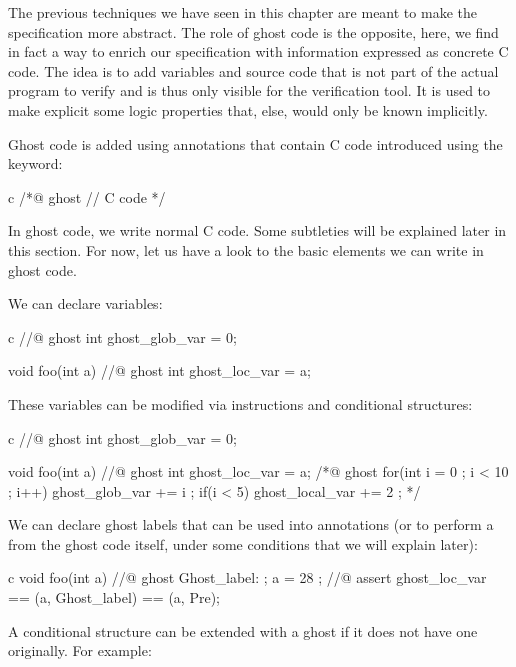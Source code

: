 
The previous techniques we have seen in this chapter are meant to make the
specification more abstract. The role of ghost code is the opposite, here, we
find in fact a way to enrich our specification with information expressed as
concrete C code. The idea is to add variables and source code that is not part
of the actual program to verify and is thus only visible for the verification
tool. It is used to make explicit some logic properties that, else, would only
be known implicitly.




Ghost code is added using annotations that contain C code
introduced using the  keyword:


\begin{CodeBlock}{c}
/*@
  ghost
  // C code
*/
\end{CodeBlock}


In ghost code, we write normal C code. Some subtleties will be explained
later in this section. For now, let us have a look to the basic elements
we can write in ghost code.


We can declare variables:


\begin{CodeBlock}{c}
//@ ghost int ghost_glob_var = 0;

void foo(int a){
  //@ ghost int ghost_loc_var = a;
}
\end{CodeBlock}


These variables can be modified via instructions and conditional structures:


\begin{CodeBlock}{c}
//@ ghost int ghost_glob_var = 0;

void foo(int a){
  //@ ghost int ghost_loc_var = a;
  /*@ ghost
    for(int i = 0 ; i < 10 ; i++){
      ghost_glob_var += i ;
      if(i < 5) ghost_local_var += 2 ;
    }
  */
}
\end{CodeBlock}


We can declare ghost labels that can be used into annotations (or to perform
a  from the ghost code itself, under some conditions that
we will explain later):


\begin{CodeBlock}{c}
void foo(int a){
  //@ ghost Ghost_label: ;
  a = 28 ;
  //@ assert ghost_loc_var == \at(a, Ghost_label) == \at(a, Pre);
}
\end{CodeBlock}


A conditional structure  can be extended with a ghost
 if it does not have one originally. For example:


